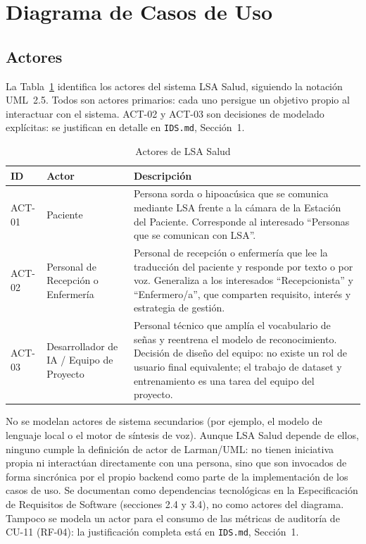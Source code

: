 \section{Diagrama de Casos de Uso}

\subsection{Actores}

La Tabla~\ref{tab:actores-cu} identifica los actores del sistema LSA Salud,
siguiendo la notación UML~2.5. Todos son actores primarios: cada uno
persigue un objetivo propio al interactuar con el sistema. ACT-02 y ACT-03
son decisiones de modelado explícitas: se justifican en detalle en
\texttt{IDS.md}, Sección~1.

\begin{table}[H]
    \centering
    \caption{Actores de LSA Salud}
    \label{tab:actores-cu}
    \begin{tabularx}{\textwidth}{l l X}
        \toprule
        \textbf{ID} & \textbf{Actor} & \textbf{Descripción} \\
        \midrule
        ACT-01 & Paciente & Persona sorda o hipoacúsica que se comunica mediante LSA frente a la cámara de la Estación del Paciente. Corresponde al interesado ``Personas que se comunican con LSA''. \\
        ACT-02 & Personal de Recepción o Enfermería & Personal de recepción o enfermería que lee la traducción del paciente y responde por texto o por voz. Generaliza a los interesados ``Recepcionista'' y ``Enfermero/a'', que comparten requisito, interés y estrategia de gestión. \\
        ACT-03 & Desarrollador de IA / Equipo de Proyecto & Personal técnico que amplía el vocabulario de señas y reentrena el modelo de reconocimiento. Decisión de diseño del equipo: no existe un rol de usuario final equivalente; el trabajo de dataset y entrenamiento es una tarea del equipo del proyecto. \\
        \bottomrule
    \end{tabularx}
\end{table}

No se modelan actores de sistema secundarios (por ejemplo, el modelo de
lenguaje local o el motor de síntesis de voz). Aunque LSA Salud depende de
ellos, ninguno cumple la definición de actor de Larman/UML: no tienen
iniciativa propia ni interactúan directamente con una persona, sino que son
invocados de forma sincrónica por el propio backend como parte de la
implementación de los casos de uso. Se documentan como dependencias
tecnológicas en la Especificación de Requisitos de Software (secciones 2.4
y 3.4), no como actores del diagrama. Tampoco se modela un actor para el
consumo de las métricas de auditoría de CU-11 (RF-04): la
justificación completa está en \texttt{IDS.md}, Sección~1.

